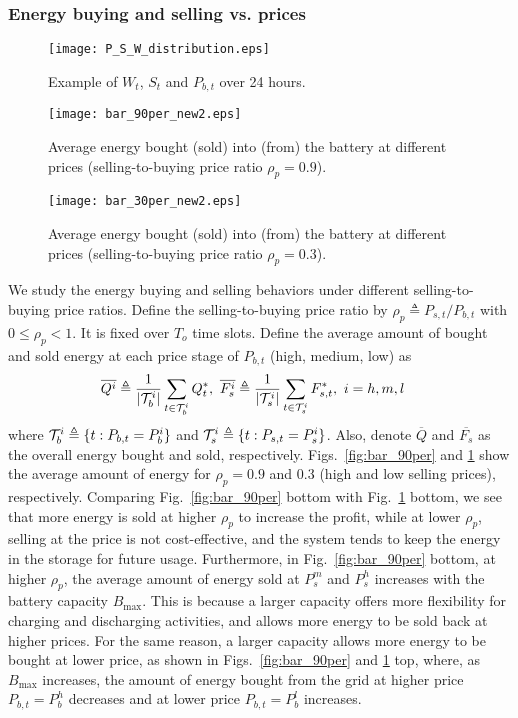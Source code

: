 \documentclass[journal]{IEEEtran}
\def\Tc{{\cal T}}
\begin{document}
\subsubsection{Energy buying and selling vs. prices}
\begin{figure}[t]
\centering
\texttt{[image: P\_S\_W\_distribution.eps]}\vspace*{-1em}
\caption{\small Example  of $W_t$, $S_t$ and $P_{b,t}$ over 24 hours. }
\label{fig:C_S_W_distribution}
\centering
\texttt{[image: bar\_90per\_new2.eps]}
\caption{\small Average energy bought (sold) into (from) the battery at different prices  (selling-to-buying price ratio $\rho_p=0.9$).}
\label{fig:bar_90per}
\centering
\texttt{[image: bar\_30per\_new2.eps]}
\caption{\small  Average energy bought (sold) into (from) the battery at different prices  (selling-to-buying price ratio $\rho_p=0.3$).}
\label{fig:bar_30per}\vspace*{-1em}
\end{figure}
We  study the energy  buying and selling behaviors under different selling-to-buying price ratios. Define the selling-to-buying price ratio by $\rho_p\triangleq {P_{s,t}}/{P_{b,t}}$ with $0\le \rho_p<1$. It is fixed over $T_o$ time slots. Define the average amount of bought and sold energy at each price stage of $P_{b,t}$  (high, medium, low)  as
\begin{align*}
\hspace*{-1em}\overline{Q^i}\triangleq \frac{1}{|\Tc_b^i|}\sum_{t\in \Tc_b^i}Q_t^*, \
\overline{F_s^i}\triangleq \frac{1}{|\Tc_s^i|}\sum_{t\in \Tc_s^i}F_{s,t}^*, \ i=h,m,l
\end{align*}
where $\Tc_b^i\triangleq\{t:P_{b,t}=P_b^i\}$ and $\Tc_s^i\triangleq\{t:P_{s,t}= P_s^i\}$. Also, denote $\overline{Q}$ and $\overline{F_s}$ as the overall energy bought and sold, respectively.  Figs.~\ref{fig:bar_90per} and \ref{fig:bar_30per} show the average amount of energy for $\rho_p=0.9$ and $0.3$ (high and low selling prices), respectively.
Comparing Fig.~\ref{fig:bar_90per} bottom with Fig.~\ref{fig:bar_30per} bottom, we see that more energy is sold  at higher $\rho_p$ to increase the profit, while at lower $\rho_p$, selling at the price is not cost-effective, and the system tends to keep the energy in the storage  for future usage.
Furthermore, in Fig.~\ref{fig:bar_90per}  bottom,  at higher $\rho_p$, the average amount of energy sold  at $P_s^m$ and $P_s^h$ increases with  the battery capacity $B_{\max}$. This is because a larger capacity offers more flexibility for charging and discharging activities, and allows more energy to be sold back at higher prices. For the same reason, a larger capacity allows more energy to be bought at lower price, as shown in  Figs.~\ref{fig:bar_90per} and \ref{fig:bar_30per} top, where, as $B_{\max}$ increases, the amount of energy bought from the grid at higher price $P_{b,t}=P_b^h$ decreases and at lower price $P_{b,t}=P_b^l$ increases.
\end{document}
